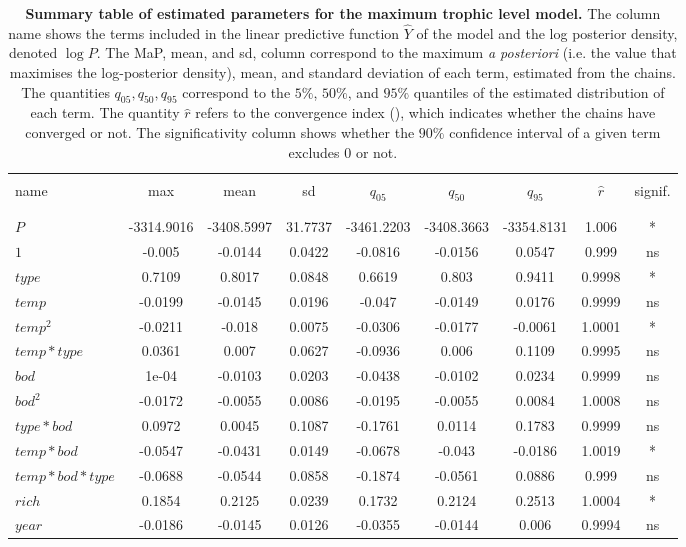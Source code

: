 \documentclass[11pt, oneside]{article}
\begin{document}
\begin{table}[H]
    \caption{
        \textbf{Summary table of estimated parameters for the maximum trophic level model.}
        The column name shows the terms included in the linear predictive function $\hat{Y}$ of the model and the log posterior density, denoted $\log P$.
        The MaP, mean, and sd, column correspond to the maximum \textit{a posteriori} (i.e. the value that maximises the log-posterior density), mean, and standard deviation of each term, estimated from the chains.
        The quantities $q_{05}, q_{50}, q_{95}$ correspond to the $5\%$, $50\%$, and $95\%$ quantiles of the estimated distribution of each term.
        The quantity $\hat{r}$ refers to the convergence index (\cite{Gelman1995}), which indicates whether the chains have converged or not.
        The significativity column shows whether the $90\%$ confidence interval of a given term excludes 0 or not.
    }
    \begin{center}
    \begin{tabular}{lcccccccc}
        \hline
        \\
        name & max & mean & sd & $q_{05}$ & $q_{50}$ & $q_{95}$ & $\hat{r}$ & signif. \\
        \\
        \hline
        \\
        $P$ & -3314.9016 & -3408.5997 & 31.7737 & -3461.2203 & -3408.3663 & -3354.8131 & 1.006 & * \\
        $1$ & -0.005 & -0.0144 & 0.0422 & -0.0816 & -0.0156 & 0.0547 & 0.999 & ns \\
        $type$ & 0.7109 & 0.8017 & 0.0848 & 0.6619 & 0.803 & 0.9411 & 0.9998 & * \\
        $temp$ & -0.0199 & -0.0145 & 0.0196 & -0.047 & -0.0149 & 0.0176 & 0.9999 & ns \\
        $temp^2$ & -0.0211 & -0.018 & 0.0075 & -0.0306 & -0.0177 & -0.0061 & 1.0001 & * \\
        $temp*type$ & 0.0361 & 0.007 & 0.0627 & -0.0936 & 0.006 & 0.1109 & 0.9995 & ns \\
        $bod$ & 1e-04 & -0.0103 & 0.0203 & -0.0438 & -0.0102 & 0.0234 & 0.9999 & ns \\
        $bod^2$ & -0.0172 & -0.0055 & 0.0086 & -0.0195 & -0.0055 & 0.0084 & 1.0008 & ns \\
        $type*bod$ & 0.0972 & 0.0045 & 0.1087 & -0.1761 & 0.0114 & 0.1783 & 0.9999 & ns \\
        $temp*bod$ & -0.0547 & -0.0431 & 0.0149 & -0.0678 & -0.043 & -0.0186 & 1.0019 & * \\
        $temp*bod*type$ & -0.0688 & -0.0544 & 0.0858 & -0.1874 & -0.0561 & 0.0886 & 0.999 & ns \\
        $rich$ & 0.1854 & 0.2125 & 0.0239 & 0.1732 & 0.2124 & 0.2513 & 1.0004 & * \\
        $year$ & -0.0186 & -0.0145 & 0.0126 & -0.0355 & -0.0144 & 0.006 & 0.9994 & ns \\
    \end{tabular}
    \end{center}
\end{table}
\end{document}

